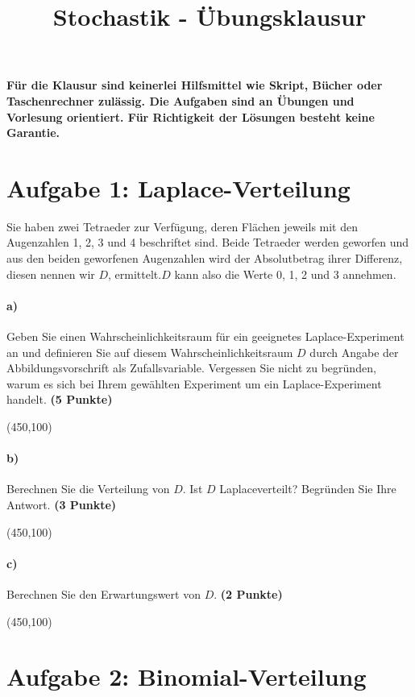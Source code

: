 \documentclass[10pt, a4paper]{article}
\title{Stochastik - Übungsklausur}
\author{}
\date{}
\begin{document}
\maketitle
\textbf{Für die Klausur sind keinerlei Hilfsmittel wie Skript, Bücher oder Taschenrechner zulässig. Die Aufgaben sind an Übungen und Vorlesung orientiert. Für Richtigkeit der Lösungen besteht keine Garantie.}

\section{Aufgabe 1: Laplace-Verteilung}
Sie haben zwei Tetraeder zur Verfügung, deren Flächen jeweils mit den Augenzahlen 1, 2, 3 und 4 beschriftet sind. Beide Tetraeder werden geworfen und aus den beiden geworfenen Augenzahlen wird der Absolutbetrag ihrer Differenz, diesen nennen wir $D$, ermittelt.$D$ kann also die Werte 0, 1, 2 und 3 annehmen.

\paragraph{a)} Geben Sie einen Wahrscheinlichkeitsraum für ein geeignetes Laplace-Experiment an und definieren Sie auf diesem Wahrscheinlichkeitsraum $D$ durch Angabe der Abbildungsvorschrift als Zufallsvariable. Vergessen Sie nicht zu begründen, warum es sich bei Ihrem gewählten Experiment um ein Laplace-Experiment handelt. \textbf{(5 Punkte)}
\begin{center}
  \framebox(450,100){}
\end{center}

\paragraph{b)} Berechnen Sie die Verteilung von $D$. Ist $D$ Laplaceverteilt? Begründen Sie Ihre Antwort.  \textbf{(3 Punkte)}
\begin{center}
  \framebox(450,100){}
\end{center}

\paragraph{c)} Berechnen Sie den Erwartungswert von $D$.  \textbf{(2 Punkte)}
\begin{center}
  \framebox(450,100){}
\end{center}


\section{Aufgabe 2: Binomial-Verteilung}
\end{document}

